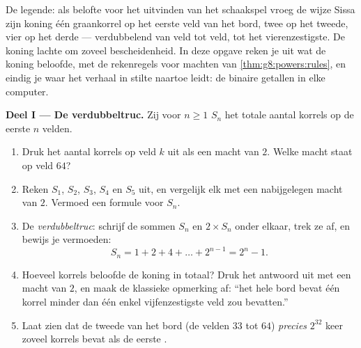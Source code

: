 \begin{problem}[{Weekendopgave --- de meetkundige \omterm{def:g1:addition:def}{som}
$1 + 2 + 4 + \dots + 2^{n-1} = 2^n - 1$, van een beroemde legende tot binaire
getallen}]
\label{pb:g8:powers:1}
De legende: als belofte voor het uitvinden van het schaakspel vroeg de wijze Sissa zijn
koning één graankorrel op het eerste veld van het bord, twee op het tweede, vier op het
derde --- verdubbelend van veld tot veld, tot het vierenzestigste. De koning lachte om
zoveel bescheidenheid. In deze opgave reken je uit wat de koning beloofde, met de
rekenregels voor machten van \cref{thm:g8:powers:rules}, en eindig je waar het verhaal
in stilte naartoe leidt: de binaire getallen in elke computer.

\medskip
\noindent\textbf{Deel I --- De verdubbeltruc.}
Zij voor $n \geq 1$ $S_n$ het totale aantal korrels op de eerste $n$ velden.
\begin{enumerate}
  \item Druk het aantal korrels op veld $k$ uit als een macht van $2$. Welke macht
        staat op veld $64$?
  \item Reken $S_1$, $S_2$, $S_3$, $S_4$ en $S_5$ uit, en vergelijk elk met een
        nabijgelegen macht van $2$. Vermoed een formule voor $S_n$.
  \item De \emph{verdubbeltruc}: schrijf de sommen $S_n$ en $2 \times S_n$ onder
        elkaar, trek ze af, en bewijs je vermoeden:
        \[
        S_n = 1 + 2 + 4 + \dots + 2^{n-1} = 2^n - 1 .
        \]
  \item Hoeveel korrels beloofde de koning in totaal? Druk het antwoord uit met een
        macht van $2$, en maak de klassieke opmerking af: ``het hele bord bevat één
        korrel minder dan één enkel vijfenzestigste veld zou bevatten.''
  \item Laat zien dat de tweede  van het bord (de velden $33$ tot $64$)
        \emph{precies} $2^{32}$ keer zoveel korrels bevat als de eerste .
\end{enumerate}


\end{problem}

